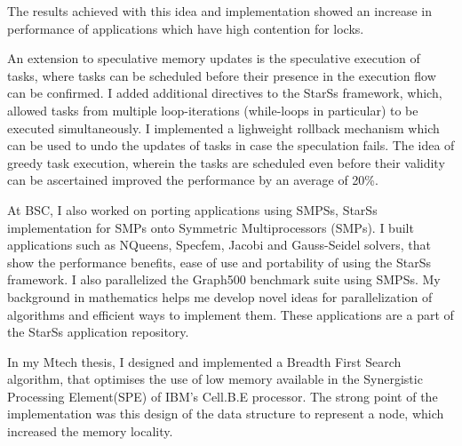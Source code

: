 \documentclass[10pt,stdletter,dateno]{newlfm}
\begin{document}
\begin{newlfm}
	   The results achieved with this idea and implementation showed an increase in performance of applications which have high contention for locks. 
%
	   \par
	   An extension to speculative memory updates is the speculative execution of tasks, where tasks can be scheduled before their presence in the execution flow can be confirmed.
	   I added additional directives to the StarSs framework, which, allowed tasks from multiple loop-iterations (while-loops in particular) to be executed simultaneously. 
	   I implemented a lighweight rollback mechanism which can be used to undo the updates of tasks in case the speculation fails.
	   The idea of greedy task execution, wherein the tasks are scheduled even before their validity can be ascertained improved the performance by an average of 20\%. 
%
	   \par
	   At BSC, I also worked on porting applications using SMPSs, StarSs implementation for SMPs onto Symmetric Multiprocessors (SMPs).
	   I built applications such as NQueens, Specfem, Jacobi and Gauss-Seidel solvers, that show the performance benefits, ease of use and portability of using the StarSs framework. 
	   I also parallelized the Graph500 benchmark suite using SMPSs.
	   My background in mathematics helps me develop novel ideas for parallelization of algorithms and efficient ways to implement them. 
	   These applications are a part of the StarSs application repository. 
%
	   \par
	   In my Mtech thesis, I designed and implemented a Breadth First Search algorithm, that optimises the use of low memory available in the Synergistic Processing Element(SPE) of IBM's Cell.B.E processor. 
	   The strong point of the implementation was this design of the data structure to represent a node, which increased the memory locality.
%
	   \par

\end{newlfm}
\end{document}
